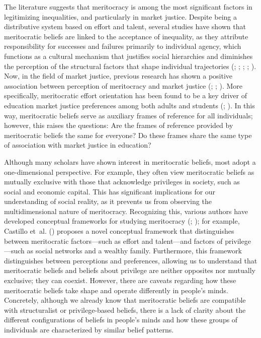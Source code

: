 \documentclass[
  spanish,
  a4paper,
  oneside]{scrbook}
\begin{document}
The literature suggests that meritocracy is among the most significant
factors in legitimizing inequalities, and particularly in market
justice. Despite being a distributive system based on effort and talent,
several studies have shown that meritocratic beliefs are linked to the
acceptance of inequality, as they attribute responsibility for successes
and failures primarily to individual agency, which functions as a
cultural mechanism that justifies social hierarchies and diminishes the
perception of the structural factors that shape individual trajectories
(;
;
;
;
). Now, in the field of
market justice, previous research has shown a positive association
between perception of meritocracy and market justice
(;
;
). More
specifically, meritocratic effort orientation has been found to be a key
driver of education market justice preferences among both adults and
students (; ). In this way, meritocratic beliefs serve as auxiliary frames of
reference for all individuals; however, this raises the questions: Are
the frames of reference provided by meritocratic beliefs the same for
everyone? Do these frames share the same type of association with market
justice in education?

Although many scholars have shown interest in meritocratic beliefs, most
adopt a one-dimensional perspective. For example, they often view
meritocratic beliefs as mutually exclusive with those that acknowledge
privileges in society, such as social and economic capital. This has
significant implications for our understanding of social reality, as it
prevents us from observing the multidimensional nature of meritocracy.
Recognizing this, various authors have developed conceptual frameworks
for studying meritocracy
(;
); for example, Castillo
et~al. () proposes a
novel conceptual framework that distinguishes between meritocratic
factors---such as effort and talent---and factors of privilege---such as
social networks and a wealthy family. Furthermore, this framework
distinguishes between perceptions and preferences, allowing us to
understand that meritocratic beliefs and beliefs about privilege are
neither opposites nor mutually exclusive; they can coexist. However,
there are caveats regarding how these meritocratic beliefs take shape
and operate differently in people's minds. Concretely, although we
already know that meritocratic beliefs are compatible with structuralist
or privilege-based beliefs, there is a lack of clarity about the
different configurations of beliefs in people's minds and how these
groups of individuals are characterized by similar belief patterns.
\end{document}
